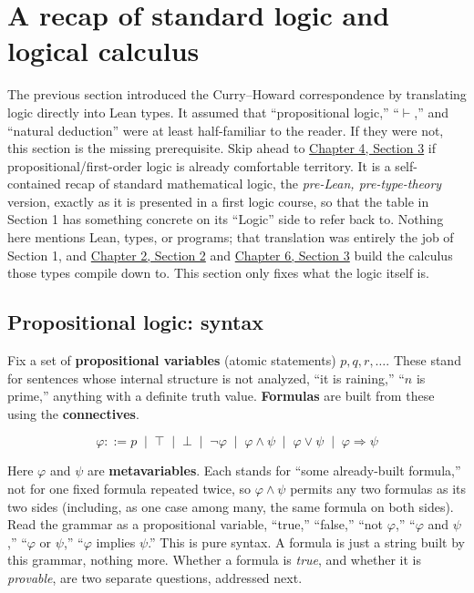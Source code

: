 \section{A recap of standard logic and logical calculus}\label{sec:04-propositions-and-proofs:02-logic-recap:1}

The previous section introduced the Curry--Howard correspondence by translating logic directly into Lean types. It assumed that ``propositional logic,'' ``\(\vdash\),'' and ``natural deduction'' were at least half-familiar to the reader. If they were not, this section is the missing prerequisite. Skip ahead to \hyperref[sec:04-propositions-and-proofs:03-theorem-lemma:1]{Chapter 4, Section 3} if propositional/first-order logic is already comfortable territory. It is a self-contained recap of standard mathematical logic, the \emph{pre-Lean, pre-type-theory} version, exactly as it is presented in a first logic course, so that the table in Section 1 has something concrete on its ``Logic'' side to refer back to. Nothing here mentions Lean, types, or programs; that translation was entirely the job of Section 1, and \hyperref[sec:02-terminology-and-coc:02-pi-sigma-and-coc:1]{Chapter 2, Section 2} and \hyperref[sec:06-rigor-check:03-typing-rules-and-safety:1]{Chapter 6, Section 3} build the calculus those types compile down to. This section only fixes what the logic itself is.

\subsection{Propositional logic: syntax}\label{sec:04-propositions-and-proofs:02-logic-recap:2}

Fix a set of \textbf{propositional variables} (atomic statements) \(p, q, r,
\dots\). These stand for sentences whose internal structure is not analyzed, ``it is raining,'' ``\(n\) is prime,'' anything with a definite truth value. \textbf{Formulas} are built from these using the \textbf{connectives}.

\[
\varphi ::= p \;\mid\; \top \;\mid\; \bot \;\mid\; \neg\varphi \;\mid\;
\varphi \wedge \psi \;\mid\; \varphi \vee \psi \;\mid\;
\varphi \Rightarrow \psi
\]

Here \(\varphi\) and \(\psi\) are \textbf{metavariables}. Each stands for ``some already-built formula,'' not for one fixed formula repeated twice, so \(\varphi \wedge \psi\) permits any two formulas as its two sides (including, as one case among many, the same formula on both sides). Read the grammar as a propositional variable, ``true,'' ``false,'' ``not \(\varphi\),'' ``\(\varphi\) and \(\psi\),'' ``\(\varphi\) or \(\psi\),'' ``\(\varphi\) implies \(\psi\).'' This is pure syntax. A formula is just a string built by this grammar, nothing more. Whether a formula is \emph{true}, and whether it is \emph{provable}, are two separate questions, addressed next.

